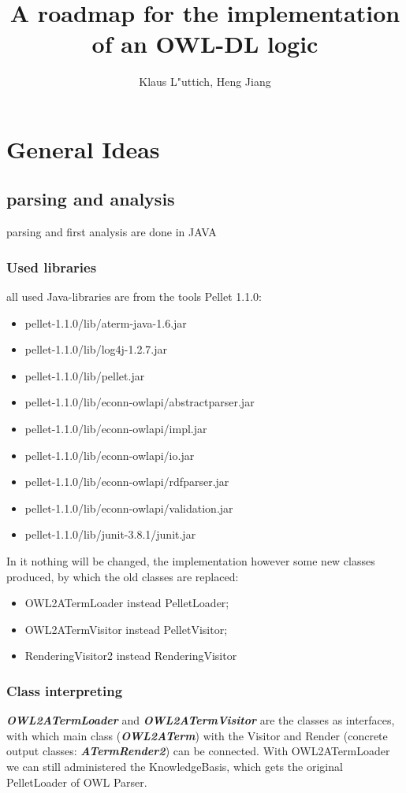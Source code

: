 \documentclass[11pt,a4paper]{article}
\begin{document}
\title{A roadmap for the implementation of an OWL-DL logic}
\author{Klaus L"uttich, Heng Jiang}
\maketitle


\section{General Ideas}

\subsection{parsing and analysis}
parsing and first analysis are done in JAVA
   \subsubsection{Used libraries}
   all used Java-libraries are from the tools Pellet 1.1.0:
   \begin{itemize}
   \item pellet-1.1.0/lib/aterm-java-1.6.jar
   \item pellet-1.1.0/lib/log4j-1.2.7.jar
   \item pellet-1.1.0/lib/pellet.jar
   \item pellet-1.1.0/lib/econn-owlapi/abstractparser.jar
   \item pellet-1.1.0/lib/econn-owlapi/impl.jar
   \item pellet-1.1.0/lib/econn-owlapi/io.jar  
   \item pellet-1.1.0/lib/econn-owlapi/rdfparser.jar
   \item pellet-1.1.0/lib/econn-owlapi/validation.jar
   \item pellet-1.1.0/lib/junit-3.8.1/junit.jar
   \end{itemize}
In it nothing will be changed, the implementation however some new classes produced, by which the old classes are replaced:
   \begin{itemize}
      \item OWL2ATermLoader instead PelletLoader;
   	  \item OWL2ATermVisitor instead PelletVisitor;
      \item RenderingVisitor2 instead RenderingVisitor
   \end{itemize}

\subsubsection{Class interpreting}
\textbf{\emph{OWL2ATermLoader} }and \textbf{\emph{OWL2ATermVisitor}} are the classes as interfaces, with which main class (\textbf{\emph{OWL2ATerm}}) with the Visitor and Render (concrete output classes: \textbf{\emph{ATermRender2}}) can be connected. With OWL2ATermLoader we can still administered the KnowledgeBasis, which gets the original PelletLoader of OWL Parser.\\
   
\end{document}
